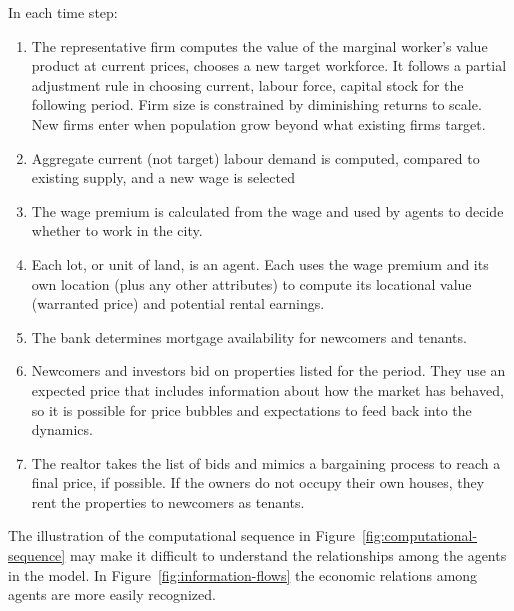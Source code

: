 In each time step:

\begin{enumerate}
\item The representative firm computes the value of the marginal worker's value product at current prices, chooses a new target workforce.  It follows a partial adjustment rule in choosing current, labour force, capital stock for the following period. Firm size is constrained by diminishing returns to scale. New firms enter when population grow beyond what existing firms target. 

\item Aggregate current (not target) labour demand is computed, compared to existing supply, and a new wage is selected

\item The wage premium is calculated from the wage and used by agents to decide whether to work in the city.

\item Each lot, or unit of land, is an agent. Each uses the wage premium and its own location (plus any other attributes) to compute its locational value (warranted price) and potential rental earnings. 

\item The bank determines mortgage availability for newcomers and tenants. 

\item Newcomers and investors bid on properties listed for the period. They use an expected price that includes information about how the market has behaved, so it is possible for price bubbles and expectations to feed back into the dynamics. 

\item The realtor takes the list of bids and mimics a bargaining process to reach a final price, if possible. If the owners do not occupy their own houses, they rent the properties to newcomers as tenants. %
\end{enumerate}


The illustration of the computational sequence in Figure~\ref{fig:computational-sequence} may make it difficult to understand the relationships among the agents in the model. In Figure~\ref{fig:information-flows} the economic relations among agents are more easily recognized.

